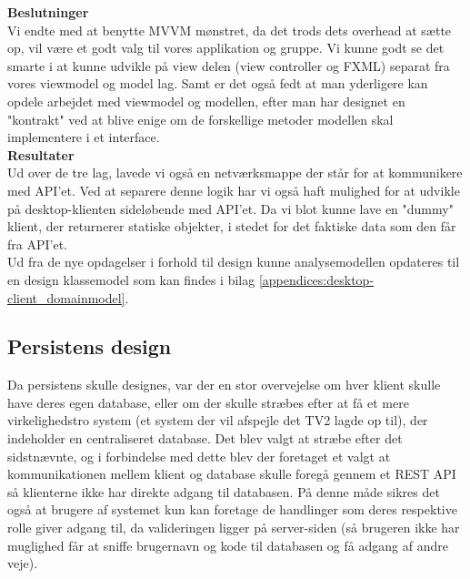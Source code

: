 \textbf{Beslutninger}\\
Vi endte med at benytte MVVM mønstret, da det trods dets overhead at sætte op, vil være et godt valg til vores applikation og gruppe. Vi kunne godt se det smarte i at kunne udvikle på view delen (view controller og FXML) separat fra vores viewmodel og model lag. Samt er det også fedt at man yderligere kan opdele arbejdet med viewmodel og modellen, efter man har designet en "kontrakt" ved at blive enige om de forskellige metoder modellen skal implementere i et interface.\\

\textbf{Resultater}\\
Ud over de tre lag, lavede vi også en netværksmappe der står for at kommunikere med API'et. Ved at separere denne logik har vi også haft mulighed for at udvikle på desktop-klienten sideløbende med API'et. Da vi blot kunne lave en "dummy" klient, der returnerer statiske objekter, i stedet for det faktiske data som den får fra API'et. \\

Ud fra de nye opdagelser i forhold til design kunne analysemodellen opdateres til en design klassemodel som kan findes i bilag \ref{appendices:desktop-client_domainmodel}.

\subsection{Persistens design}
Da persistens skulle designes, var der en stor overvejelse om hver klient skulle have deres egen database, 
eller om der skulle stræbes efter at få et mere virkelighedstro system (et system der vil afspejle det TV2 lagde op til),
der indeholder en centraliseret database. Det blev valgt at stræbe efter det sidstnævnte,
og i forbindelse med dette blev der foretaget et valgt at kommunikationen mellem klient og database skulle foregå gennem et REST API så klienterne ikke har direkte adgang til databasen. På denne måde sikres det også at brugere af systemet kun kan foretage de handlinger som deres respektive rolle giver adgang til,
da valideringen ligger på server-siden (så brugeren ikke har muglighed får at sniffe brugernavn og kode til databasen og få adgang af andre veje).